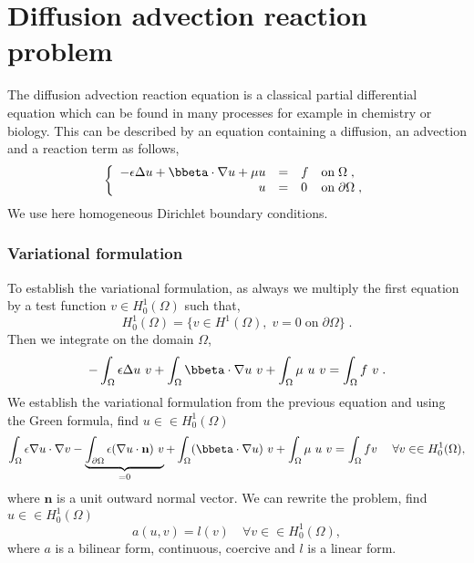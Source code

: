 %

\section{Diffusion advection reaction problem}
\label{sec:tuto-myadvection}

The diffusion advection reaction equation is a classical partial differential
equation which can be found in many processes for example in chemistry or
biology. This can be described by an equation containing a diffusion, an
advection and a reaction term as follows,
%
\begin{equation}
  \left\{
    \begin{array}{rcll}
      -\epsilon\Delta  u + \bbeta \cdot \nabla  u + \mu u & = & f & \text{on}\; \Omega \;, \\
      u  & = & 0 & \text{on}\; \partial\Omega \;, \\
    \end{array}
  \right.
  \label{eq:tuto-adv}
\end{equation}
%
We use here homogeneous Dirichlet boundary conditions.

\subsubsection{Variational formulation}

To establish the variational formulation, as always we multiply the first equation by a
test function $v\in H_0^1(\Omega)$ such that,
\[
    H_0^1(\Omega) = \{ v\in H^1(\Omega),\; v=0 \; \text{on} \; \partial\Omega \} \;.
\]
Then we integrate on the domain $\Omega$,
%
\begin{equation}
- \int_\Omega \epsilon \Delta u\ v
+ \int_\Omega \bbeta \cdot \nabla u\ v
+ \int_\Omega \mu\ u\ v
= \int_\Omega f\ v \;.
\end{equation}
%
We establish the variational formulation from the previous equation and using
the Green formula, find $u \in \in H_0^1(\Omega)$
%
\begin{equation}
  \int_\Omega \epsilon \nabla u \cdot \nabla v
  - \underbrace{\int_{\partial\Omega} \epsilon (\nabla u \cdot \mathbf n)\ v}_{=0}
  + \int_\Omega (\bbeta \cdot \nabla u)\ v
  + \int_\Omega \mu\ u\ v
  = \int_\Omega f v \; \quad \forall v \in \in H_0^1(\Omega),
  \label{eq:tuto-adv-varform}
\end{equation}
%
where $\mathbf n$ is a unit outward normal vector. We can rewrite the problem,
find $u \in \in H_0^1(\Omega)$
%
\begin{equation}
    a(u,v) = l(v) \quad \forall v \in \in H_0^1(\Omega),
\label{eq:tuto-adv-bilform}
\end{equation}
%
where $a$ is a bilinear form, continuous, coercive and $l$ is a linear form.

